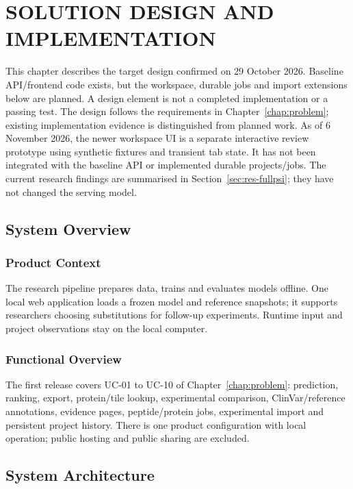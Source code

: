 \chapter{SOLUTION DESIGN AND IMPLEMENTATION}\label{chap:design}

This chapter describes the target design confirmed on 29 October 2026. Baseline API/frontend code
exists, but the workspace, durable jobs and import extensions below are planned. A design element is
not a completed implementation or a passing test. The design follows the requirements in
Chapter~\ref{chap:problem}; existing implementation evidence is distinguished from planned work.
As of 6 November 2026, the newer workspace UI is a separate interactive review prototype using
synthetic fixtures and transient tab state. It has not been integrated with the baseline API or
implemented durable projects/jobs. The current research findings are summarised in
Section~\ref{sec:res-fullpsi}; they have not changed the serving model.

\section{System Overview}
\subsection{Product Context}
The research pipeline prepares data, trains and evaluates models offline. One local web application
loads a frozen model and reference snapshots; it supports researchers choosing substitutions for
follow-up experiments. Runtime input and project observations stay on the local computer.
\subsection{Functional Overview}
The first release covers UC-01 to UC-10 of Chapter~\ref{chap:problem}: prediction, ranking, export,
protein/tile lookup, experimental comparison, ClinVar/reference annotations, evidence pages,
peptide/protein jobs, experimental import and persistent project history. There is one product
configuration with local operation; public hosting and public sharing are excluded.

\section{System Architecture}
